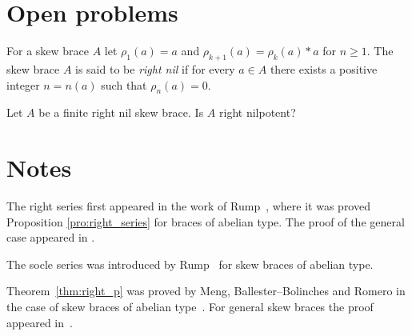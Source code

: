 \section{Open problems}
\begin{problem}
    \label{question:rightnil=>rightnilp} 
For a skew brace $A$ let $\rho_1(a)=a$ and $\rho_{k+1}(a)=\rho_k(a)*a$ for
$n\geq1$.  The skew brace $A$ is said to be \emph{right nil} if for every $a\in A$ there
exists a positive integer $n=n(a)$ such that $\rho_n(a)=0$. 

Let $A$ be a finite right nil skew brace.  Is $A$ right
    nilpotent? 
\end{problem}

\section{Notes}

The right series first appeared in the work of Rump~\cite{MR2278047}, 
where it was proved Proposition \ref{pro:right_series} for braces of abelian type. The proof of the general case appeared in \cite{MR3957824}.  

The socle series was introduced by Rump~\cite{MR2278047} for skew braces of abelian type. 


Theorem~\ref{thm:right_p} was proved by Meng, Ballester--Bolinches and Romero in the case of skew  braces of abelian type~\cite{MR3935814}. For general skew
braces the proof appeared in~\cite{MR4062375}. 
